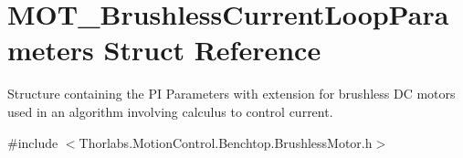 \hypertarget{struct_m_o_t___brushless_current_loop_parameters}{}\section{M\+O\+T\+\_\+\+Brushless\+Current\+Loop\+Parameters Struct Reference}
\label{struct_m_o_t___brushless_current_loop_parameters}


Structure containing the PI Parameters with extension for brushless DC motors used in an algorithm involving calculus to control current.  




{\ttfamily \#include $<$Thorlabs.\+Motion\+Control.\+Benchtop.\+Brushless\+Motor.\+h$>$}

